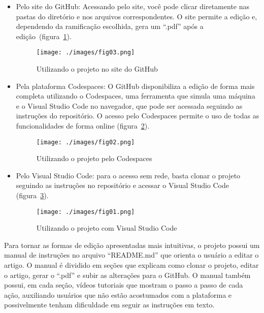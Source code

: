 \begin{itemize}
	\item Pelo site do GitHub: Acessando pelo site, você pode clicar diretamente nas pastas do diretório e nos arquivos correspondentes. O site permite a edição e, dependendo da ramificação escolhida, gera um ``.pdf'' após a edição~(figura~\ref{fig:fig01}).
	
	\begin{figure}[H]
		\centering
		\texttt{[image: ./images/fig03.png]}
		\caption{Utilizando o projeto no site do GitHub}
		\label{fig:fig01}
	\end{figure}

	\item Pela plataforma Codespaces: O GitHub disponibiliza a edição de forma mais completa utilizando o Codespaces, uma ferramenta que simula uma máquina e o Visual Studio Code no navegador, que pode ser acessada seguindo as instruções do repositório. O acesso pelo Codespaces permite o uso de todas as funcionalidades de forma online (figura~\ref{fig:fig02}).
	
	\begin{figure}[H]
		\centering
		\texttt{[image: ./images/fig02.png]}
		\caption{Utilizando o projeto pelo Codespaces}
		\label{fig:fig02}
	\end{figure}

	\item Pelo Visual Studio Code: para o acesso sem rede, basta clonar o projeto seguindo as instruções no repositório e acessar o Visual Studio Code (figura~\ref{fig:fig03}).
	
	\begin{figure}[H]
		\centering
		\texttt{[image: ./images/fig01.png]}
		\caption{Utilizando o projeto com Visual Studio Code}
		\label{fig:fig03}
	\end{figure}
\end{itemize}

Para tornar as formas de edição apresentadas mais intuitivas, o projeto possui um manual de instruções no arquivo ``README.md'' que orienta o usuário a editar o artigo. O manual é dividido em seções que explicam como clonar o projeto, editar o artigo, gerar o ``.pdf'' e subir as alterações para o GitHub. O manual também possui, em cada seção, vídeos tutoriais que mostram o passo a passo de cada ação, auxiliando usuários que não estão acostumados com a plataforma e possivelmente tenham dificuldade em seguir as instruções em texto.

